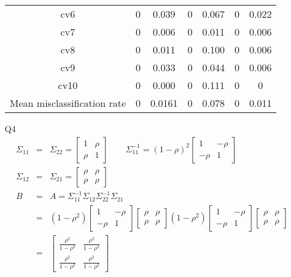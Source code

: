 \documentclass{article}
\begin{document}
\begin{itemize}
\begin{tabular}{c | c c | c c | c c |}
cv6 & 0 & 0.039 & 0 & 0.067 & 0 & 0.022 \\
cv7 & 0 & 0.006 & 0 & 0.011 & 0 & 0.006 \\
cv8 & 0 & 0.011 & 0 & 0.100 & 0 & 0.006 \\
cv9 & 0 & 0.033 & 0 & 0.044 & 0 & 0.006 \\
cv10 & 0 & 0.000 & 0 & 0.111 & 0 & 0 \\
\hline
Mean misclassification rate & 0 & 0.0161 & 0 & 0.078 & 0 & 0.011
\end{tabular}
\item[Q4]
\begin{eqnarray*}
\Sigma_{11} & = & \Sigma_{22} = \begin{bmatrix}
1 & \rho \\
\rho & 1
\end{bmatrix} \qquad \Sigma_{11}^{-1} = (1- \rho)^2 \begin{bmatrix}
1 & -\rho \\
-\rho & 1
\end{bmatrix} \\
\Sigma_{12} & = & \Sigma_{21} = \begin{bmatrix}
\rho & \rho \\
\rho & \rho
\end{bmatrix} \\
B & = & A = \Sigma_{11}^{-1}\Sigma_{12}\Sigma_{22}^{-1}\Sigma_{21} \\
& = & (1 - \rho^2)\begin{bmatrix}
1 & -\rho \\
-\rho & 1
\end{bmatrix} \begin{bmatrix}
\rho & \rho \\
\rho & \rho
\end{bmatrix}  (1 - \rho^2)\begin{bmatrix}
1 & -\rho \\
-\rho & 1
\end{bmatrix} \begin{bmatrix}
\rho & \rho \\
\rho & \rho
\end{bmatrix}\\
& = & \begin{bmatrix}
\frac{\rho^2}{1 - \rho^2} & \frac{\rho^2}{1 - \rho^2} \\
\frac{\rho^2}{1 - \rho^2} & \frac{\rho^2}{1 - \rho^2}
\end{bmatrix}
\end{eqnarray*}
\begin{equation*}

\end{equation*}
\end{itemize}
\end{document}
